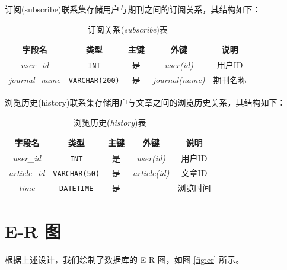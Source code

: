 \documentclass[UTF8,openany]{ctexbook}
\begin{document}
订阅(subscribe)联系集存储用户与期刊之间的订阅关系，其结构如下：

\begin{table}[H]
    \centering
    \begin{tabular}{|c|c|c|c|c|}
        \hline
        \textbf{字段名} & \textbf{类型} & \textbf{主键} & \textbf{外键} & \textbf{说明} \\
        \hline
        \textit{user\_id} & \texttt{INT} & 是 & \textit{user(id)} & 用户ID \\
        \hline
        \textit{journal\_name} & \texttt{VARCHAR(200)} & 是 & \textit{journal(name)} & 期刊名称 \\
        \hline
    \end{tabular}
    \caption{订阅关系(\textit{subscribe})表}
\end{table}

浏览历史(history)联系集存储用户与文章之间的浏览历史关系，其结构如下：

\begin{table}[H]
    \centering
    \begin{tabular}{|c|c|c|c|c|}
        \hline
        \textbf{字段名} & \textbf{类型} & \textbf{主键} & \textbf{外键} & \textbf{说明} \\
        \hline
        \textit{user\_id} & \texttt{INT} & 是 & \textit{user(id)} & 用户ID \\
        \hline
        \textit{article\_id} & \texttt{VARCHAR(50)} & 是 & \textit{article(id)} & 文章ID \\
        \hline
        \textit{time} & \texttt{DATETIME} & 是 &  & 浏览时间 \\
        \hline
    \end{tabular}
    \caption{浏览历史(\textit{history})表}
\end{table}

\section{E-R 图}
\label{sec:er}



根据上述设计，我们绘制了数据库的 E-R 图，如图 \ref{fig:er} 所示。
\end{document}
